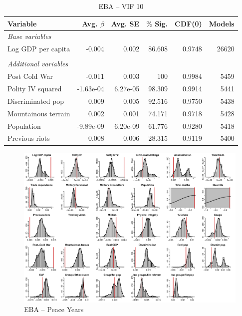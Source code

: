 \begin{table}[H]
\centering
\begin{tabular}{lrrrrr}
\hline
\textbf{Variable} & \textbf{Avg. $\beta$} & \textbf{Avg. SE} & \textbf{$\%$ Sig.} & \textbf{CDF(0)} & \textbf{Models} \\ \hline
\textit{Base variables} &  &  &  &  &  \\
Log GDP per capita & -0.004 & 0.002 & 86.608 & 0.9748 & 26620 \\
 &  &  &  &  &  \\
\textit{Additional variables} &  &  &  &  &  \\
Post Cold War & -0.011 & 0.003 & 100 & 0.9984 & 5459\\
Polity IV squared & -1.63e-04 & 6.27e-05 & 98.309 & 0.9914 & 5441 \\
Discriminated pop & 0.009 & 0.005 & 92.516 & 0.9750 & 5438 \\
Mountainous terrain & 0.002 & 0.001 & 74.171 & 0.9718 & 5428\\
Population & -9.89e-09 & 6.20e-09 & 61.776 & 0.9280 & 5418 \\
Previous riots  & 0.008 & 0.006 & 28.315 & 0.9119 & 5400\\ \hline
\end{tabular}
\caption{EBA -- VIF 10}
\label{tab:mk-high-vif}
\end{table}

\clearpage
\begin{figure}
    \centering
    \includegraphics[width=\textwidth]{images/mk-nowar.pdf}
    \caption{EBA -- Peace Years}
    \label{fig:mk-postcoldwar}
\end{figure}
\clearpage

